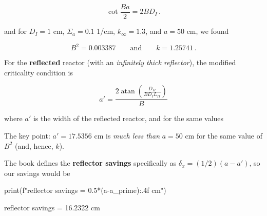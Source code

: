 \documentclass[compact]{ne630handout}
\begin{document}
\begin{handoutflow}
\[
  \cot{\frac{Ba}{2}} = 2BD_I  \, .
\]

and for \(D_I = 1\) cm, \(\Sigma_a = 0.1\) 1/cm, \(k_{\infty} = 1.3\), and \(a = 50\) cm, we found

\[
B^2 = 0.003387 \qquad \text{and} \qquad  k = 1.25741 \, .
\]

For the \textbf{reflected} reactor (with an \emph{infinitely thick reflector}), the modified criticality condition is

\[
  a' = \frac{2 \operatorname{atan}{\left(\frac{D_{II}}{B D_{I} L_{II}} \right)}}{B}
\]

where \(a'\) is the width of the reflected reactor, and for the same values

The key point: \(a' = 17.5356\) cm is \emph{much less than} \(a = 50\) cm for the same value of \(B^2\) (and, hence, \(k\)).

The book defines the \textbf{reflector savings} specifically as \(\delta_x = (1/2)(a-a')\), so our savings would be

\begin{NEunicodecode}
print(f"reflector savings = {0.5*(a-a_prime):.4f} cm")
\end{NEunicodecode}
\begin{NEunicodecode}
reflector savings = 16.2322 cm
\end{NEunicodecode}

\end{handoutflow}
\end{document}
